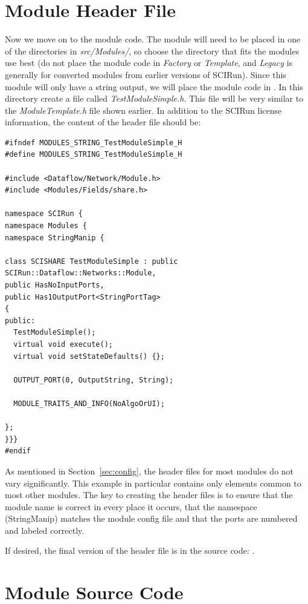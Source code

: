 \documentclass[fleqn,11pt,openany]{book}
\begin{document}
\section{Module Header File}
\label{sec:examp_header}

Now we move on to the module code.
The module will need to be placed in one of the directories in \emph{src/Modules/}, so choose the directory that fits the modules use best (do not place the module code in \emph{Factory} or \emph{Template}, and \emph{Legacy} is generally for converted modules from earlier versions of SCIRun).
Since this module will only have a string output, we will place the module code in \emph{}.
In this directory create a file called \emph{TestModuleSimple.h}.  
This file will be very similar to the \emph{ModuleTemplate.h} file shown earlier.
In addition to the SCIRun license information, the content of the header file should be:
\begin{verbatim}
#ifndef MODULES_STRING_TestModuleSimple_H
#define MODULES_STRING_TestModuleSimple_H

#include <Dataflow/Network/Module.h>
#include <Modules/Fields/share.h>

namespace SCIRun {
namespace Modules {
namespace StringManip {

class SCISHARE TestModuleSimple : public SCIRun::Dataflow::Networks::Module,
public HasNoInputPorts,
public Has1OutputPort<StringPortTag>
{
public:
  TestModuleSimple();
  virtual void execute();
  virtual void setStateDefaults() {};
  
  OUTPUT_PORT(0, OutputString, String);
  
  MODULE_TRAITS_AND_INFO(NoAlgoOrUI);
  
};
}}}
#endif
\end{verbatim}
As mentioned in Section~\ref{sec:config}, the header files for most modules do not vary significantly.  
This example in particular contains only elements common to most other modules.
The key to creating the header files is to ensure that the module name is correct in every place it occurs, that the namespace (StringManip) matches the module config file and that the ports are numbered and labeled correctly.  

If desired, the final version of the header file is in the source code: \emph{}.

\section{Module Source Code}
\label{sec:examp_source}
\end{document}
